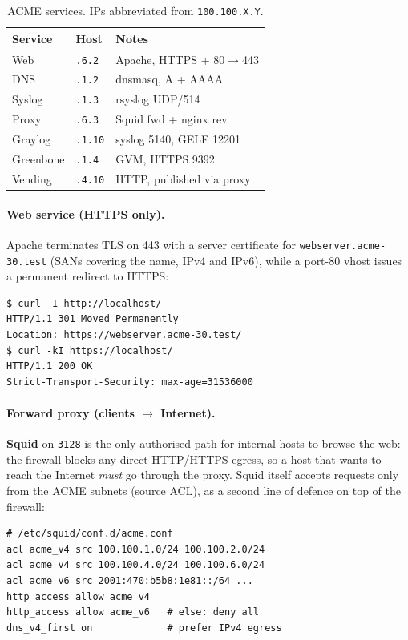\documentclass[twocolumn]{NobArticle}
\begin{document}
\begin{table}[H]
\centering
\begin{tabular}{lll}
\toprule
\textbf{Service} & \textbf{Host} & \textbf{Notes} \\
\midrule
Web        & \texttt{.6.2}  & Apache, HTTPS + 80$\to$443 \\
DNS        & \texttt{.1.2}  & dnsmasq, A + AAAA \\
Syslog     & \texttt{.1.3}  & rsyslog UDP/514 \\
Proxy      & \texttt{.6.3}  & Squid fwd + nginx rev \\
Graylog    & \texttt{.1.10} & syslog 5140, GELF 12201 \\
Greenbone  & \texttt{.1.4}  & GVM, HTTPS 9392 \\
Vending    & \texttt{.4.10} & HTTP, published via proxy \\
\bottomrule
\end{tabular}
\caption{ACME services. IPs abbreviated from \texttt{100.100.X.Y}.}
\label{tab:services}
\end{table}

\paragraph{Web service (HTTPS only).}
Apache terminates TLS on 443 with a server certificate for
\texttt{webserver.acme-30.test} (SANs covering the name, IPv4 and IPv6), while a
port-80 vhost issues a permanent redirect to HTTPS:

\begin{lstlisting}
$ curl -I http://localhost/
HTTP/1.1 301 Moved Permanently
Location: https://webserver.acme-30.test/
$ curl -kI https://localhost/
HTTP/1.1 200 OK
Strict-Transport-Security: max-age=31536000
\end{lstlisting}

\paragraph{Forward proxy (clients $\to$ Internet).}
\textbf{Squid} on \texttt{3128} is the only authorised path for internal hosts
to browse the web: the firewall blocks any direct HTTP/HTTPS egress, so a host
that wants to reach the Internet \textit{must} go through the proxy. Squid itself
accepts requests only from the ACME subnets (source ACL), as a second line of
defence on top of the firewall:

\begin{lstlisting}
# /etc/squid/conf.d/acme.conf
acl acme_v4 src 100.100.1.0/24 100.100.2.0/24
acl acme_v4 src 100.100.4.0/24 100.100.6.0/24
acl acme_v6 src 2001:470:b5b8:1e81::/64 ...
http_access allow acme_v4
http_access allow acme_v6   # else: deny all
dns_v4_first on             # prefer IPv4 egress
\end{lstlisting}
\end{document}
